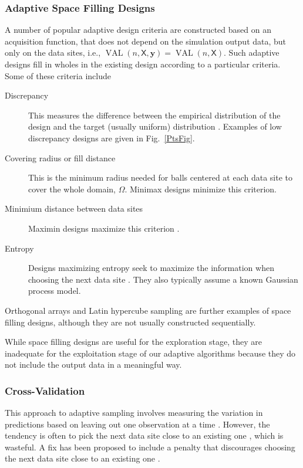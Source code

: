 \documentclass[11pt]{NSFamsart}
\DeclareMathOperator{\VAL}{VAL}
\newcommand{\mX}{\mathsf{X}}
\newcommand{\by}{{\boldsymbol{y}}}
\begin{document}
\subsubsection{Adaptive Space Filling Designs}
A number of popular adaptive design criteria are constructed based on an acquisition function, that does not depend on the simulation output data, but only on the data sites, i.e., $\VAL(n,\mX,\by) = \VAL(n,\mX)$.  Such adaptive designs fill in wholes in the existing design according to a particular criteria.  Some of these criteria include 
\begin{description}
    \item[Discrepancy] This measures the difference between the empirical distribution of the design and the target (usually uniform) distribution \cite{FangEtal19a}.  Examples of low discrepancy designs are given in Fig.\ \ref{PtsFig}.  
    \item[Covering radius or fill distance] This is the minimum radius needed for balls centered at each data site to cover the whole domain, $\Omega$.  Minimax designs minimize this criterion.
    \item[Minimium distance between data sites]  Maximin designs maximize this criterion \cite{jin2002sequential}.
    \item[Entropy] Designs maximizing entropy seek to maximize the information when choosing the next data site \cite{jin2002sequential}.  They also typically assume a known Gaussian process model.
\end{description}
Orthogonal arrays and Latin hypercube sampling are further examples of space filling designs, although they are not usually constructed sequentially.  

While space filling designs are useful for the exploration stage, they are inadequate for the exploitation stage of our adaptive algorithms because they do not include the output data in a meaningful way.  

\subsubsection{Cross-Validation}
This approach to adaptive sampling involves measuring the variation in predictions based on leaving out one observation at a time \cite{aute2013cross,jin2002sequential, kleijnen2004application}.  However, the tendency is often to pick the next data site close to an existing one \cite{jin2002sequential}, which is wasteful.  A fix has been proposed to include a penalty that discourages choosing the next data site close to an existing one \cite{aute2013cross,jin2002sequential}.
\end{document}
